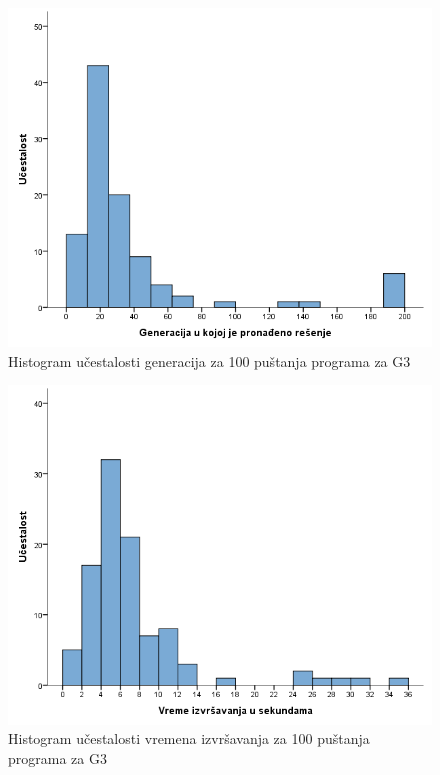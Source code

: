 \documentclass[12pt]{article}
\begin{document}
	\begin{figure}[H]
	\begin{center}
		\includegraphics[scale=0.4]{generacije1.png}
	\end{center}
	\caption{{\small Histogram učestalosti generacija za 100 puštanja programa za G3}}
	\label{fig:slika5}
\end{figure}

\vspace*{3\baselineskip}

	\begin{figure}[H]
	\begin{center}
		\includegraphics[scale=0.4]{vreme1.png}
	\end{center}
	\caption{{\small Histogram učestalosti vremena izvršavanja za 100 puštanja programa za G3}}
	\label{fig:slika6}
\end{figure}
\end{document}
